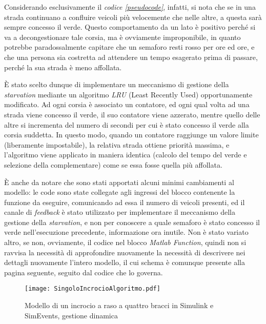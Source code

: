Considerando esclusivamente il \textit{codice \ref{pseudocode}}, infatti, si nota che se in una strada continuano a confluire veicoli più velocemente che nelle altre, a questa sarà sempre concesso il verde. Questo comportamento da un lato è positivo perché si va a decongestionare tale corsia, ma è ovviamente improponibile, in quanto potrebbe paradossalmente capitare che un semaforo resti rosso per ore ed ore, e che una persona sia costretta ad attendere un tempo esagerato prima di passare, perché la sua strada è meno affollata.

È stato scelto dunque di implementare un meccanismo di gestione della \textit{starvation} mediante un algoritmo \textit{LRU} (Least Recently Used) opportunamente modificato. Ad ogni corsia è associato un contatore, ed ogni qual volta ad una strada viene concesso il verde, il suo contatore viene azzerato, mentre quello delle altre si incrementa del numero di secondi per cui è stato concesso il verde alla corsia suddetta. In questo modo, quando un contatore raggiunge un valore limite (liberamente impostabile), la relativa strada ottiene priorità massima, e l’algoritmo viene applicato in maniera identica (calcolo del tempo del verde e selezione della complementare) come se essa fosse quella più affollata.

È anche da notare che sono stati apportati alcuni minimi cambiamenti al modello: le code sono state collegate agli ingressi del blocco contenente la funzione da eseguire, comunicando ad essa il numero di veicoli presenti, ed il canale di \textit{feedback} è stato utilizzato per implementare il meccanismo della gestione della \textit{starvation}, e non per conoscere a quale semaforo è stato concesso il verde nell’esecuzione precedente, informazione ora inutile. Non è stato variato altro, se non, ovviamente, il codice nel blocco \textit{Matlab Function}, quindi non si ravvisa la necessità di approfondire nuovamente la necessità di descrivere nei dettagli nuovamente l'intero modello, il cui schema è comunque presente alla pagina seguente, seguito dal codice che lo governa.

\begin{figure}[H]
  \texttt{[image: SingoloIncrocioAlgoritmo.pdf]}
  \caption{Modello di un incrocio a raso a quattro bracci in Simulink e SimEvents, gestione dinamica}
  \label{fig:modellosingoloincrocioalgoritmo}
\end{figure}
\newpage

